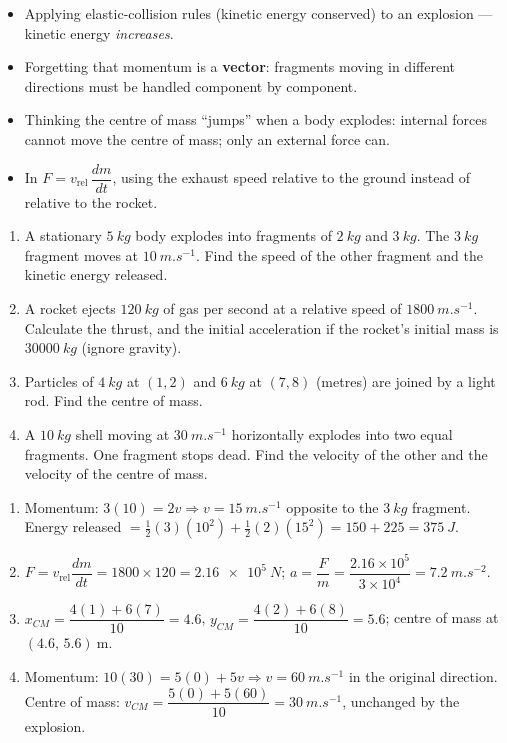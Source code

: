 \documentclass[11pt]{article}
\begin{document}
\begin{attention}
\begin{itemize}
\item Applying elastic-collision rules (kinetic energy conserved) to an explosion — kinetic energy \emph{increases}.
\item Forgetting that momentum is a \textbf{vector}: fragments moving in different directions must be handled component by component.
\item Thinking the centre of mass ``jumps'' when a body explodes: internal forces cannot move the centre of mass; only an external force can.
\item In $F=v_{\text{rel}}\,\dfrac{dm}{dt}$, using the exhaust speed relative to the ground instead of relative to the rocket.
\end{itemize}
\end{attention}

\begin{exercice}
\begin{enumerate}
\item A stationary $\SI{5}{kg}$ body explodes into fragments of $\SI{2}{kg}$ and $\SI{3}{kg}$. The $\SI{3}{kg}$ fragment moves at $\SI{10}{m.s^{-1}}$. Find the speed of the other fragment and the kinetic energy released.
\item A rocket ejects $\SI{120}{kg}$ of gas per second at a relative speed of $\SI{1800}{m.s^{-1}}$. Calculate the thrust, and the initial acceleration if the rocket's initial mass is $\SI{30000}{kg}$ (ignore gravity).
\item Particles of $\SI{4}{kg}$ at $(1,2)$ and $\SI{6}{kg}$ at $(7,8)$ (metres) are joined by a light rod. Find the centre of mass.
\item A $\SI{10}{kg}$ shell moving at $\SI{30}{m.s^{-1}}$ horizontally explodes into two equal fragments. One fragment stops dead. Find the velocity of the other and the velocity of the centre of mass.
\end{enumerate}
\end{exercice}

\begin{corrige}[Exercise 1]
\begin{enumerate}
\item Momentum: $3(10)=2v \Rightarrow v=\SI{15}{m.s^{-1}}$ opposite to the $\SI{3}{kg}$ fragment. Energy released $=\tfrac12(3)(10^2)+\tfrac12(2)(15^2)=150+225=\SI{375}{J}$.
\item $F=v_{\text{rel}}\dfrac{dm}{dt}=1800\times120=\SI{2.16e5}{N}$; $a=\dfrac{F}{m}=\dfrac{2.16\times10^{5}}{3\times10^{4}}=\SI{7.2}{m.s^{-2}}$.
\item $x_{CM}=\dfrac{4(1)+6(7)}{10}=4.6$, $y_{CM}=\dfrac{4(2)+6(8)}{10}=5.6$; centre of mass at $(4.6,\,5.6)\ \mathrm{m}$.
\item Momentum: $10(30)=5(0)+5v \Rightarrow v=\SI{60}{m.s^{-1}}$ in the original direction. Centre of mass: $v_{CM}=\dfrac{5(0)+5(60)}{10}=\SI{30}{m.s^{-1}}$, unchanged by the explosion.
\end{enumerate}
\end{corrige}
\end{document}
